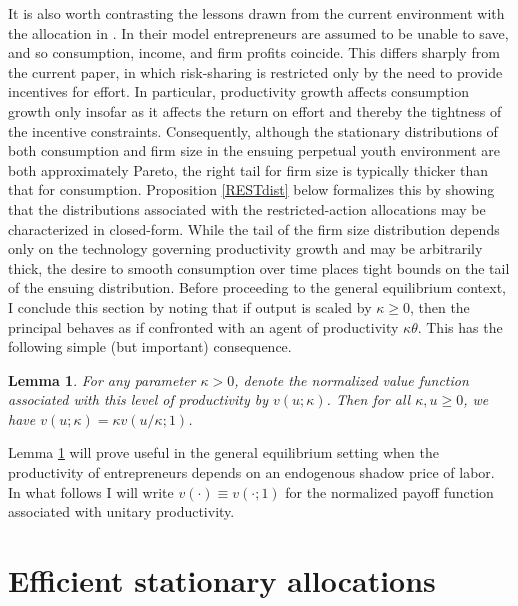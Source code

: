 \documentclass[11pt]{article}
\theoremstyle{plain}
\newtheorem{lemma}[thm]{Lemma}
\begin{document}

It is also worth contrasting the lessons drawn from the current environment with the allocation in \cite{jones_schumpeterian_2018}. In their model entrepreneurs are assumed to be unable to save, and so consumption, income, and firm profits coincide. This differs sharply from the current paper, in which risk-sharing is restricted only by the need to provide incentives for effort. In particular, productivity growth affects consumption growth only insofar as it affects the return on effort and thereby the tightness of the incentive constraints. Consequently, although the stationary distributions of both consumption and firm size in the ensuing perpetual youth environment are both approximately Pareto, the right tail for firm size is typically thicker than that for consumption. Proposition \ref{RESTdist} below formalizes this by showing that the distributions associated with the restricted-action allocations may be characterized in closed-form. While the tail of the firm size distribution depends only on the technology governing productivity growth and may be arbitrarily thick, the desire to smooth consumption over time places tight bounds on the tail of the ensuing distribution. Before proceeding to the general equilibrium context, I conclude this section by noting that if output is scaled by $\kappa \geq 0$, then the principal behaves as if confronted with an agent of productivity $\kappa \theta$. This has the following simple (but important) consequence.

\begin{lemma} \label{scalehomog}
For any parameter $\kappa > 0$, denote the normalized value function associated with this level of productivity by $v(u;\kappa)$. Then for all $\kappa, u \geq0$, we have $v(u; \kappa) = \kappa v(u/\kappa; 1)$.
\end{lemma}

\noindent Lemma \ref{scalehomog} will prove useful in the general equilibrium setting when the productivity of entrepreneurs depends on an endogenous shadow price of labor. In what follows I will write $v(\cdot) \equiv v(\cdot;1)$ for the normalized payoff function associated with unitary productivity.


\section{Efficient stationary allocations} \label{GenEq}
\end{document}
